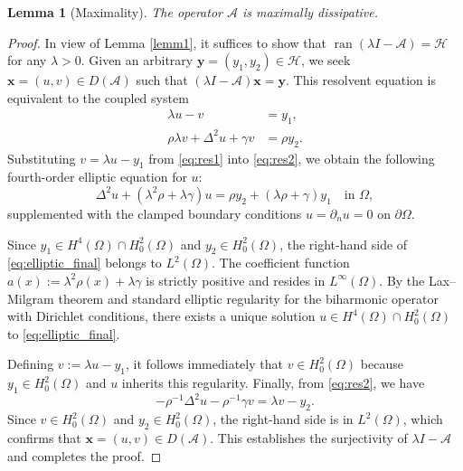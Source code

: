 \documentclass[12pt,reqno]{amsart}
\newtheorem{lemm}[theo]{Lemma}
\numberwithin{equation}{section}
\begin{document}
	\begin{lemm}[Maximality] \label{lemm2} 
		The operator $\mathcal{A}$ is maximally dissipative.
	\end{lemm}	
	
	\begin{proof}
		In view of Lemma \ref{lemm1}, it suffices to show that $\operatorname{ran}(\lambda I - \mathcal{A}) = \mathcal{H}$ for any $\lambda > 0$. Given an arbitrary $\mathbf{y} = (y_1, y_2) \in \mathcal{H}$, we seek $\mathbf{x} = (u, v) \in D(\mathcal{A})$ such that $(\lambda I - \mathcal{A})\mathbf{x} = \mathbf{y}$. This resolvent equation is equivalent to the coupled system
		\begin{align}
			\lambda u - v &= y_1, \label{eq:res1} \\
			\rho \lambda v + \Delta^2 u + \gamma v &= \rho y_2. \label{eq:res2}
		\end{align}
		Substituting $v = \lambda u - y_1$ from \eqref{eq:res1} into \eqref{eq:res2}, we obtain the following fourth-order elliptic equation for $u$:
		\begin{equation}\label{eq:elliptic_final}
			\Delta^2 u + (\lambda^2 \rho + \lambda \gamma) u = \rho y_2 + (\lambda \rho + \gamma) y_1 \quad \text{in } \Omega,
		\end{equation}
		supplemented with the clamped boundary conditions $u = \partial_n u = 0$ on $\partial\Omega$. 
		
		Since $y_1 \in H^4(\Omega) \cap H_0^2(\Omega)$ and $y_2 \in H_0^2(\Omega)$, the right-hand side of \eqref{eq:elliptic_final} belongs to $L^2(\Omega)$. The coefficient function $a(x) := \lambda^2 \rho(x) + \lambda \gamma$ is strictly positive and resides in $L^\infty(\Omega)$. By the Lax--Milgram theorem and standard elliptic regularity for the biharmonic operator with Dirichlet conditions, there exists a unique solution $u \in H^4(\Omega) \cap H_0^2(\Omega)$ to \eqref{eq:elliptic_final}.
		
		Defining $v := \lambda u - y_1$, it follows immediately that $v \in H_0^2(\Omega)$ because $y_1 \in H_0^2(\Omega)$ and $u$ inherits this regularity. Finally, from \eqref{eq:res2}, we have
		\[
		-\rho^{-1} \Delta^2 u - \rho^{-1} \gamma v = \lambda v - y_2.
		\]
		Since $v \in H_0^2(\Omega)$ and $y_2 \in H_0^2(\Omega)$, the right-hand side is in $L^2(\Omega)$, which confirms that $\mathbf{x} = (u, v) \in D(\mathcal{A})$. This establishes the surjectivity of $\lambda I - \mathcal{A}$ and completes the proof.
	\end{proof}
	
\end{document}
